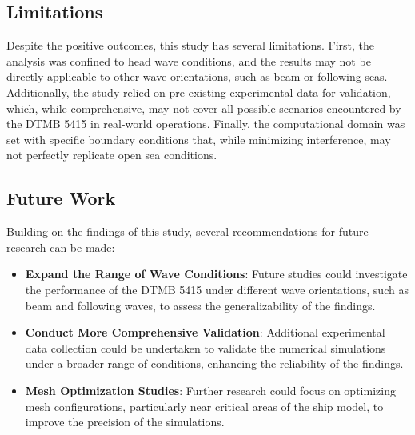 \documentclass[12pt]{article} %
\begin{document}
\subsection{Limitations}
Despite the positive outcomes, this study has several limitations. First, the analysis was 
confined to head wave conditions, and the results may not be directly applicable to other wave 
orientations, such as beam or following seas. Additionally, the study relied on pre-existing 
experimental data for validation, which, while comprehensive, may not cover all possible 
scenarios encountered by the DTMB 5415 in real-world operations. Finally, the computational 
domain was set with specific boundary conditions that, while minimizing interference, may not 
perfectly replicate open sea conditions.

\subsection{Future Work}

Building on the findings of this study, several recommendations for future research can be made:

\begin{itemize}
    \item \textbf{Expand the Range of Wave Conditions}: Future studies could investigate the performance of the DTMB 5415 under different wave orientations, such as beam and following waves, to assess the generalizability of the findings.
    
    
    \item \textbf{Conduct More Comprehensive Validation}: Additional experimental data collection could be undertaken to validate the numerical simulations under a broader range of conditions, enhancing the reliability of the findings.
    
    \item \textbf{Mesh Optimization Studies}: Further research could focus on optimizing mesh configurations, particularly near critical areas of the ship model, to improve the precision of the simulations.
\end{itemize}
\end{document}
